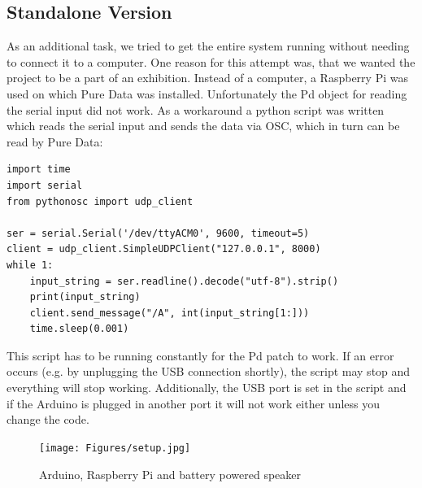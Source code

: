 \subsection{Standalone Version}
As an additional task, we tried to get the entire system running without needing to connect it to a computer. One reason for this attempt was, that we wanted the project to be a part of an exhibition. Instead of a computer, a Raspberry Pi was used on which Pure Data was installed. Unfortunately the Pd object for reading the serial input did not work. As a workaround a python script was written which reads the serial input and sends the data via OSC, which in turn can be read by Pure Data:
\begin{lstlisting}[style=styC++]
import time
import serial
from pythonosc import udp_client

ser = serial.Serial('/dev/ttyACM0', 9600, timeout=5)
client = udp_client.SimpleUDPClient("127.0.0.1", 8000)
while 1:
    input_string = ser.readline().decode("utf-8").strip()
    print(input_string)
    client.send_message("/A", int(input_string[1:]))
    time.sleep(0.001)
\end{lstlisting}
This script has to be running constantly for the Pd patch to work. If an error occurs (e.g. by unplugging the USB connection shortly), the script may stop and everything will stop working. Additionally, the USB port is set in the script and if the Arduino is plugged in another port it will not work either unless you change the code.
\begin{figure}[H]
\begin{center}
\texttt{[image: Figures/setup.jpg]}
\caption{Arduino, Raspberry Pi and battery powered speaker}
\end{center}
\end{figure}




